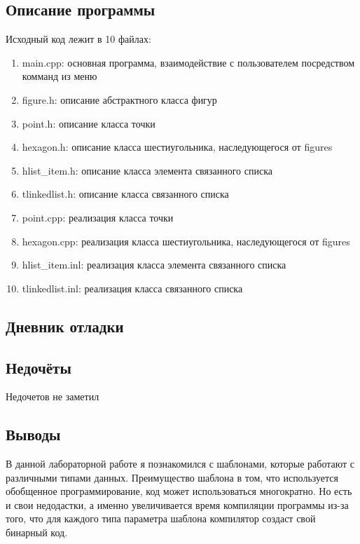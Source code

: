 \documentclass[12pt]{article}
\begin{document}
\subsection*{Описание программы}

Исходный код лежит в 10 файлах:
\begin{enumerate}
\item main.cpp: основная программа, взаимодействие с пользователем посредством комманд из меню

\item figure.h:    описание абстрактного класса фигур

\item point.h:     описание класса точки
\item hexagon.h: описание класса шестиугольника, наследующегося от figures
\item hlist\_item.h: описание класса элемента связанного списка
\item tlinkedlist.h: описание класса связанного списка

\item point.cpp:     реализация класса точки
\item hexagon.cpp:  реализация класса шестиугольника, наследующегося от figures
\item hlist\_item.inl: реализация класса элемента связанного списка
\item tlinkedlist.inl: реализация класса связанного списка

\end{enumerate}

\subsection*{Дневник отладки}

\subsection*{Недочёты}
Недочетов не заметил

\subsection*{Выводы}
В данной лабораторной работе я познакомился с шаблонами, которые работают с различными типами данных. Преимущество шаблона в том, что используется обобщенное программирование, код может использоваться многократно. Но есть и свои недодастки, а именно увеличивается время компиляции программы из-за того, что для каждого типа параметра шаблона компилятор создаст свой бинарный код.
\end{document}
